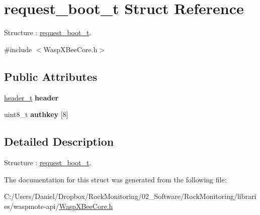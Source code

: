 \hypertarget{structrequest__boot__t}{}\section{request\+\_\+boot\+\_\+t Struct Reference}
\label{structrequest__boot__t}


Structure \+: \hyperlink{structrequest__boot__t}{request\+\_\+boot\+\_\+t}.  




{\ttfamily \#include $<$Wasp\+X\+Bee\+Core.\+h$>$}

\subsection*{Public Attributes}
\begin{DoxyCompactItemize}
\item 
\hyperlink{structheader__t}{header\+\_\+t} {\bfseries header}\hypertarget{structrequest__boot__t_af86dd7430f248e25c788d696fc2a1a9b}{}\label{structrequest__boot__t_af86dd7430f248e25c788d696fc2a1a9b}

\item 
uint8\+\_\+t {\bfseries authkey} \mbox{[}8\mbox{]}\hypertarget{structrequest__boot__t_a717497fee73db86689c6f318e8ced2d0}{}\label{structrequest__boot__t_a717497fee73db86689c6f318e8ced2d0}

\end{DoxyCompactItemize}


\subsection{Detailed Description}
Structure \+: \hyperlink{structrequest__boot__t}{request\+\_\+boot\+\_\+t}. 

The documentation for this struct was generated from the following file\+:\begin{DoxyCompactItemize}
\item 
C\+:/\+Users/\+Daniel/\+Dropbox/\+Rock\+Monitoring/02\+\_\+\+Software/\+Rock\+Monitoring/libraries/waspmote-\/api/\hyperlink{_wasp_x_bee_core_8h}{Wasp\+X\+Bee\+Core.\+h}\end{DoxyCompactItemize}
